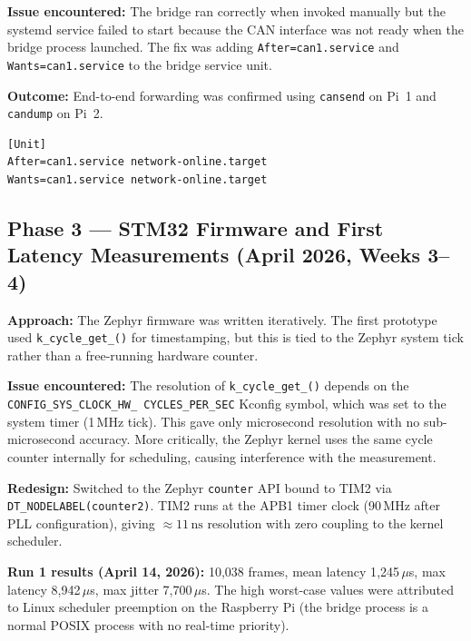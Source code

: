\documentclass[11pt,a4paper]{article}
\begin{document}
\textbf{Issue encountered:} The bridge ran correctly when invoked manually but the
systemd service failed to start because the CAN interface was not ready when the bridge
process launched.  The fix was adding \texttt{After=can1.service} and
\texttt{Wants=can1.service} to the bridge service unit.

\textbf{Outcome:} End-to-end forwarding was confirmed using \texttt{cansend} on
Pi~1 and \texttt{candump} on Pi~2.

\begin{lstlisting}[caption={Service dependency fix in acf-can-bridge.service}]
[Unit]
After=can1.service network-online.target
Wants=can1.service network-online.target
\end{lstlisting}

\subsection{Phase 3 --- STM32 Firmware and First Latency Measurements (April 2026, Weeks 3--4)}

\textbf{Approach:} The Zephyr firmware was written iteratively.  The first prototype
used \texttt{k\_\allowbreak cycle\_\allowbreak get\_()} for timestamping,
but this is tied to the Zephyr system tick rather than a free-running hardware counter.

\textbf{Issue encountered:} The resolution of
\texttt{k\_\allowbreak cycle\_\allowbreak get\_()} depends on the
\texttt{CONFIG\_\allowbreak SYS\_\allowbreak CLOCK\_\allowbreak HW\_\allowbreak
CYCLES\_\allowbreak PER\_\allowbreak SEC} Kconfig symbol, which was set to the system
timer (1\,MHz tick).  This gave only microsecond resolution with no sub-microsecond
accuracy.  More critically, the Zephyr kernel uses the same cycle counter internally
for scheduling, causing interference with the measurement.

\textbf{Redesign:} Switched to the Zephyr \texttt{counter} API bound to TIM2 via
\texttt{DT\_NODELABEL(counter2)}.  TIM2 runs at the APB1 timer clock (90\,MHz after
PLL configuration), giving $\approx 11\,\text{ns}$ resolution with zero coupling to
the kernel scheduler.

\textbf{Run 1 results (April 14, 2026):} 10{,}038 frames, mean latency 1{,}245\,$\mu$s,
max latency 8{,}942\,$\mu$s, max jitter 7{,}700\,$\mu$s.  The high worst-case values
were attributed to Linux scheduler preemption on the Raspberry Pi (the bridge process
is a normal POSIX process with no real-time priority).
\end{document}
